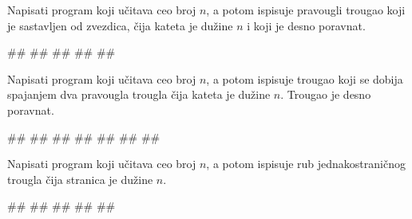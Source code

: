 \begin{Exercise}[label=p1.7_] 
Napisati program koji učitava ceo broj $n$, a potom ispisuje pravougli
trougao koji je sastavljen od zvezdica, čija kateta je dužine $n$ i koji je
desno poravnat.


\begin{miditest}
\begin{upotreba}{1}
#\naslovInt#
##
#\izlaz{\ \ *}#
#\izlaz{\ ***}#
#\izlaz{*****}#
\end{upotreba}
\end{miditest}
\end{Exercise}
\begin{Answer}[ref=p1.7_]
\end{Answer}

\begin{Exercise}[label=p1.7_] 
Napisati program koji učitava ceo broj $n$, a potom ispisuje trougao
koji se dobija spajanjem dva pravougla trougla čija kateta je dužine
$n$. Trougao je desno poravnat.


\begin{miditest}
\begin{upotreba}{1}
#\naslovInt#
##
#\izlaz{\ \ *}#
#\izlaz{\ ***}#
#\izlaz{*****}#
#\izlaz{\ ***}#
#\izlaz{\ \ *}#
\end{upotreba}
\end{miditest}
\end{Exercise}
\begin{Answer}[ref=p1.7_]
\end{Answer}


\begin{Exercise}[label=p1.7_] 
Napisati program koji učitava ceo broj $n$, a potom ispisuje
rub jednakostraničnog trougla čija stranica je dužine $n$.

\begin{miditest}
\begin{upotreba}{1}
#\naslovInt#
##
#\izlaz{\ \ *}#
#\izlaz{\ *\ *}#
#\izlaz{*\ *\ *}#
\end{upotreba}
\end{miditest}
\end{Exercise}
\begin{Answer}[ref=p1.7_]
\end{Answer}

